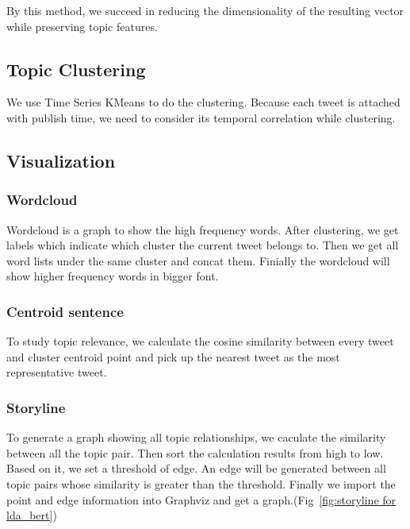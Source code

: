 By this method, we succeed in reducing the dimensionality of the resulting vector while preserving topic features.

\subsection{Topic Clustering}
We use Time Series KMeans to do the clustering. Because each tweet is attached with publish time, we need to consider its temporal correlation while clustering. 

\subsection{Visualization}
\subsubsection{Wordcloud}
Wordcloud is a graph to show the high frequency words. After clustering, we get labels which indicate which cluster the current tweet belongs to. Then we get all word lists under the same cluster and concat them. Finially the wordcloud will show higher frequency words in bigger font.
\subsubsection{Centroid sentence}
To study topic relevance, we calculate the cosine similarity between every tweet and cluster centroid point and pick up the nearest tweet as the most representative tweet.  
\subsubsection{Storyline}
To generate a graph showing all topic relationships, we caculate the similarity between all the topic pair. Then sort the calculation results from high to low. Based on it, we set a threshold of edge. An edge will be generated between all topic pairs whose similarity is greater than the threshold. Finally we import the point and edge information into Graphviz and get a graph.(Fig~\ref{fig:storyline for lda_bert}) 
